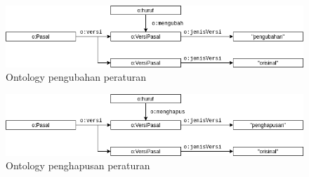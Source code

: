 \begin{figure}[H]
  \centering
  \includegraphics[width=\textwidth]{pictures/update.png}
  \caption{Ontology pengubahan peraturan}
  \label{fig:update}
\end{figure}

\begin{figure}[H]
  \centering
  \includegraphics[width=\textwidth]{pictures/delete.png}
  \caption{Ontology penghapusan peraturan}
  \label{fig:delete}
\end{figure}
